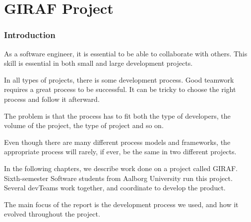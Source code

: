\part{GIRAF Project}

\section{Introduction}

As a software engineer, it is essential to be able to collaborate with others. This skill is essential in both small and large development projects.

In all types of projects, there is some development process. Good teamwork requires a great process to be successful. It can be tricky to choose the right process and follow it afterward.

The problem is that the process has to fit both the type of developers, the volume of the project, the type of project and so on.

Even though there are many different process models and frameworks, the appropriate process will rarely, if ever, be the same in two different projects.

In the following chapters, we describe work done on a project called GIRAF. Sixth-semester Software students from Aalborg University run this project. Several \glspl{devTeam} work together, and coordinate to develop the product.

The main focus of the report is the development process we used, and how it evolved throughout the project.

